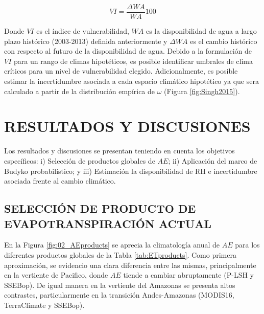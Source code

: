 \documentclass[12pt]{article}
\begin{document}
\begin{equation}
VI = \frac{\Delta WA}{WA}100
\end{equation}

Donde $VI$ es el índice de vulnerabilidad, $WA$ es la disponibilidad de agua a largo plazo histórico (2003-2013) definida anteriormente y $\Delta WA$ es el cambio histórico con respecto al futuro de la disponibilidad de agua. Debido a la formulación de $VI$ para un rango de climas hipotéticos, es posible identificar umbrales de clima críticos para un nivel de vulnerabilidad elegido. Adicionalmente, es posible estimar la incertidumbre asociada a cada espacio climático hipotético ya que sera calculado a partir de la distribución empírica de $\omega$ (Figura \ref{fig:Singh2015}).

\clearpage
\vspace*{0.5mm}
\section{RESULTADOS Y DISCUSIONES}

\thispagestyle{empty}

Los resultados y discusiones se presentan teniendo en cuenta los objetivos específicos: i) Selección de productos globales de $AE$; ii) Aplicación del marco de Budyko probabilístico; y iii) Estimación la disponibilidad de RH e incertidumbre asociada frente al cambio climático.

\subsection{SELECCIÓN DE PRODUCTO DE EVAPOTRANSPIRACIÓN ACTUAL}

En la Figura \ref{fig:02_AEproducts} se aprecia la climatología anual de $AE$ para los diferentes productos globales de la Tabla \ref{tab:ETproducts}. Como primera aproximación, se evidencio una clara diferencia entre las mismas, principalmente en la vertiente de Pacifico, donde $AE$ tiende a cambiar abruptamente (P-LSH y SSEBop). De igual manera en la vertiente del Amazonas se presenta altos contrastes, particularmente en la transición Andes-Amazonas (MODIS16, TerraClimate y SSEBop). 

\thispagestyle{empty}


\end{document}
